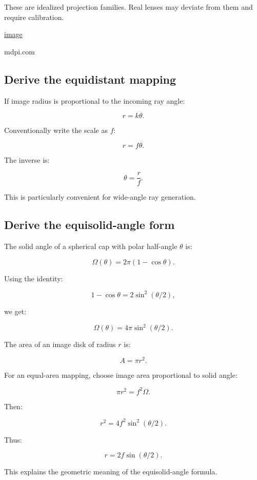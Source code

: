 These are idealized projection families. Real lenses may deviate from them and require calibration. 

\href{https://www.google.com/s2/favicons?domain=https://www.mdpi.com&sz=32}{image}

mdpi.com

\subsection{Derive the equidistant mapping}\label{02-foundations-ii-ch035-derive-the-equidistant-mapping}

If image radius is proportional to the incoming ray angle:

\[ r=k\theta. \]

Conventionally write the scale as \(f\):

\[ \boxed{r=f\theta}. \]

The inverse is:

\[ \boxed{\theta=\frac rf}. \]

This is particularly convenient for wide-angle ray generation.

\subsection{Derive the equisolid-angle form}\label{02-foundations-ii-ch035-derive-the-equisolid-angle-form}

The solid angle of a spherical cap with polar half-angle \(\theta\) is:

\[ \boxed{ \Omega(\theta)=2\pi(1-\cos\theta). } \]

Using the identity:

\[ 1-\cos\theta=2\sin^2(\theta/2), \]

we get:

\[ \Omega(\theta)=4\pi\sin^2(\theta/2). \]

The area of an image disk of radius \(r\) is:

\[ A=\pi r^2. \]

For an equal-area mapping, choose image area proportional to solid angle:

\[ \pi r^2=f^2\Omega. \]

Then:

\[ r^2=4f^2\sin^2(\theta/2). \]

Thus:

\[ \boxed{ r=2f\sin(\theta/2). } \]

This explains the geometric meaning of the equisolid-angle formula.

